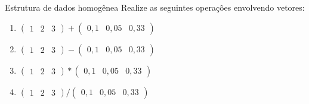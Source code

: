 \documentclass[
  10pt,
  ignorenonframetext,
]{beamer}
\providecommand{\tightlist}{%
  \setlength{\itemsep}{0pt}\setlength{\parskip}{0pt}}
\begin{document}
\begin{frame}{Estrutura de dados homogênea}
\protect\hypertarget{estrutura-de-dados-homoguxeanea-10}{}
Realize as seguintes operações envolvendo vetores:

\begin{enumerate}
\tightlist
\item
  \(\begin{pmatrix} 1 & 2 & 3 \end{pmatrix} + \begin{pmatrix} 0,1 & 0,05 & 0,33 \end{pmatrix}\)
\item
  \(\begin{pmatrix} 1 & 2 & 3 \end{pmatrix} - \begin{pmatrix} 0,1 & 0,05 & 0,33 \end{pmatrix}\)
\item
  \(\begin{pmatrix} 1 & 2 & 3 \end{pmatrix} * \begin{pmatrix} 0,1 & 0,05 & 0,33 \end{pmatrix}\)
\item
  \(\begin{pmatrix} 1 & 2 & 3 \end{pmatrix} / \begin{pmatrix} 0,1 & 0,05 & 0,33 \end{pmatrix}\)
\end{enumerate}
\end{frame}
\end{document}
